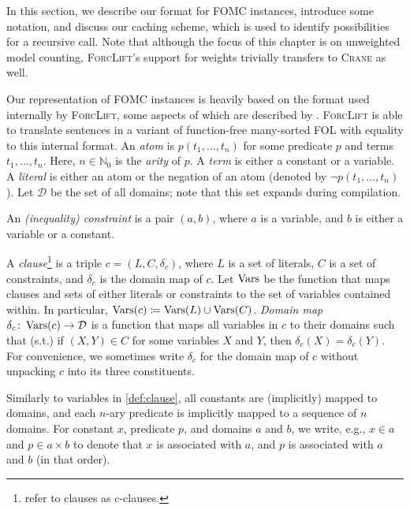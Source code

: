 In this section, we describe our format for FOMC instances, introduce some
notation, and discuss our caching scheme, which is used to identify
possibilities for a recursive call. Note that although the focus of this chapter
is on unweighted model counting, \textsc{ForcLift}'s
\citep{DBLP:conf/ijcai/BroeckTMDR11} support for weights trivially transfers to
\textsc{Crane} as well.

Our representation of FOMC instances is heavily based on the format used
internally by \textsc{ForcLift}, some aspects of which are described by
\citet{DBLP:conf/ijcai/BroeckTMDR11}. \textsc{ForcLift} is able to translate
sentences in a variant of function-free many-sorted FOL with equality to this
internal format. An \emph{atom} is $p(t_1, \dots, t_n)$ for some predicate $p$
and terms $t_{1}, \dots, t_{n}$. Here, $n \in \mathbb{N}_0$ is the \emph{arity}
of $p$. A \emph{term} is either a constant or a variable. A \emph{literal} is
either an atom or the negation of an atom (denoted by
$\neg p(t_1, \dots, t_n)$). Let $\mathcal{D}$ be the set of all domains; note
that this set expands during compilation.

\begin{definition}[Constraint]\label{def:constraint}
  An \emph{(inequality) constraint} is a pair $(a, b)$, where $a$ is a variable,
  and $b$ is either a variable or a constant.
\end{definition}

\begin{definition}[Clause]\label{def:clause}
  A \emph{clause}\footnote{\citet{DBLP:conf/ijcai/BroeckTMDR11} refer to clauses
    as c-clauses.} is a triple $c = (L, C, \delta_c)$, where $L$ is a set of
  literals, $C$ is a set of constraints, and $\delta_c$ is the domain map of
  $c$. Let $\operatorname{Vars}$ be the function that maps clauses and sets of either literals
  or constraints to the set of variables contained within. In particular,
  $\operatorname{Vars}(c) \coloneqq \operatorname{Vars}(L) \cup \operatorname{Vars}(C)$. \emph{Domain map}
  $\delta_{c}\colon \operatorname{Vars}(c) \to \mathcal{D}$ is a function that maps all
  variables in $c$ to their domains such that (s.t.) if $(X, Y) \in C$ for some
  variables $X$ and $Y$, then $\delta_c(X) = \delta_c(Y)$. For convenience, we
  sometimes write $\delta_c$ for the domain map of $c$ without unpacking $c$
  into its three constituents.
\end{definition}

Similarly to variables in \cref{def:clause}, all constants are (implicitly)
mapped to domains, and each $n$-ary predicate is implicitly mapped to a sequence
of $n$ domains. For constant $x$, predicate $p$, and domains $a$ and $b$, we
write, e.g., $x \in a$ and $p \in a \times b$ to denote that $x$ is associated
with $a$, and $p$ is associated with $a$ and $b$ (in that order).

